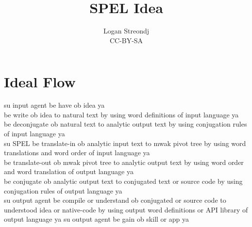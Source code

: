 \documentclass[12pt]{article}
\title{SPEL Idea}
\author{Logan Streondj\\
CC-BY-SA}
\begin{document}
\maketitle
\section{Ideal Flow}
su input agent be have ob idea ya\\
be write ob idea to natural text 
by using word definitions of input language ya\\
be deconjugate ob natural text to analytic output text 
by using conjugation rules of input language ya\\
su SPEL be translate-in ob analytic input text 
to mwak pivot tree 
by using word translations and word order of input language ya\\
be translate-out ob mwak pivot tree to analytic output text
by using  word order and word translation of output language ya\\
be conjugate ob analytic output text 
to conjugated text or source code
by using conjugation rules of output language ya\\
su output agent be compile or understand ob conjugated or source
code to understood idea or native-code by using output word
definitions or API library of output language ya
su output agent be gain ob skill or app ya
\end{document}

